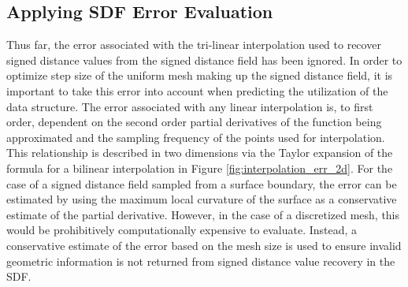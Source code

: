 
\subsection{Applying SDF Error Evaluation}

Thus far, the error associated with the tri-linear interpolation used to recover
signed distance values from the signed distance field has been ignored. In order
to optimize step size of the uniform mesh making up the signed distance field,
it is important to take this error into account when predicting the utilization
of the data structure. The error associated with any linear interpolation is, to
first order, dependent on the second order partial derivatives of the function
being approximated and the sampling frequency of the points used for
interpolation. This relationship is described in two dimensions via the Taylor
expansion of the formula for a bilinear interpolation in Figure
\ref{fig:interpolation_err_2d}. For the case of a signed distance field sampled
from a surface boundary, the error can be estimated by using the maximum local
curvature of the surface as a conservative estimate of the partial
derivative. However, in the case of a discretized mesh, this would be
prohibitively computationally expensive to evaluate. Instead, a conservative
estimate of the error based on the mesh size is used to ensure invalid geometric
information is not returned from signed distance value recovery in the SDF.

